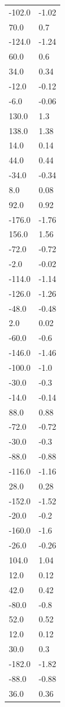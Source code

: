 \begin{longtable}{ll}
-102.0 & -1.02 \\
70.0 & 0.7 \\
-124.0 & -1.24 \\
60.0 & 0.6 \\
34.0 & 0.34 \\
-12.0 & -0.12 \\
-6.0 & -0.06 \\
130.0 & 1.3 \\
138.0 & 1.38 \\
14.0 & 0.14 \\
44.0 & 0.44 \\
-34.0 & -0.34 \\
8.0 & 0.08 \\
92.0 & 0.92 \\
-176.0 & -1.76 \\
156.0 & 1.56 \\
-72.0 & -0.72 \\
-2.0 & -0.02 \\
-114.0 & -1.14 \\
-126.0 & -1.26 \\
-48.0 & -0.48 \\
2.0 & 0.02 \\
-60.0 & -0.6 \\
-146.0 & -1.46 \\
-100.0 & -1.0 \\
-30.0 & -0.3 \\
-14.0 & -0.14 \\
88.0 & 0.88 \\
-72.0 & -0.72 \\
-30.0 & -0.3 \\
-88.0 & -0.88 \\
-116.0 & -1.16 \\
28.0 & 0.28 \\
-152.0 & -1.52 \\
-20.0 & -0.2 \\
-160.0 & -1.6 \\
-26.0 & -0.26 \\
104.0 & 1.04 \\
12.0 & 0.12 \\
42.0 & 0.42 \\
-80.0 & -0.8 \\
52.0 & 0.52 \\
12.0 & 0.12 \\
30.0 & 0.3 \\
-182.0 & -1.82 \\
-88.0 & -0.88 \\
36.0 & 0.36 \\

\end{longtable}
